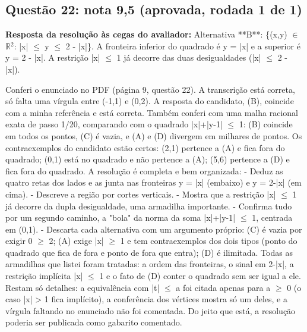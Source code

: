 \documentclass{article}%
\begin{document}
\subsection*{Questão 22: nota 9,5 (aprovada, rodada 1 de 1)}%
\textbf{Resposta da resolução às cegas do avaliador:} Alternativa **B**: \{(x,y) $\in$ $\mathbb{R}$$^2$: |x| $\leq$ y $\leq$ 2 {-} |x|\}. A fronteira inferior do quadrado é y = |x| e a superior é y = 2 {-} |x|. A restrição |x| $\leq$ 1 já decorre das duas desigualdades (|x| $\leq$ 2 {-} |x|).\par %
Conferi o enunciado no PDF (página 9, questão 22). A transcrição está correta, só falta uma vírgula entre (-1,1) e (0,2). A resposta do candidato, (B), coincide com a minha referência e está correta. Também conferi com uma malha racional exata de passo 1/20, comparando com o quadrado |x|+|y-1| $\leq$ 1: (B) coincide em todos os pontos, (C) é vazia, e (A) e (D) divergem em milhares de pontos. Os contraexemplos do candidato estão certos: (2,1) pertence a (A) e fica fora do quadrado; (0,1) está no quadrado e não pertence a (A); (5,6) pertence a (D) e fica fora do quadrado.\newline%
\newline%
A resolução é completa e bem organizada:\newline%
{-} Deduz as quatro retas dos lados e as junta nas fronteiras y = |x| (embaixo) e y = 2-|x| (em cima).\newline%
{-} Descreve a região por cortes verticais.\newline%
{-} Mostra que a restrição |x| $\leq$ 1 já decorre da dupla desigualdade, uma armadilha importante.\newline%
{-} Confirma tudo por um segundo caminho, a "bola" da norma da soma |x|+|y-1| $\leq$ 1, centrada em (0,1).\newline%
{-} Descarta cada alternativa com um argumento próprio: (C) é vazia por exigir 0 $\geq$ 2; (A) exige |x| $\geq$ 1 e tem contraexemplos dos dois tipos (ponto do quadrado que fica de fora e ponto de fora que entra); (D) é ilimitada.\newline%
\newline%
Todas as armadilhas que listei foram tratadas: a ordem das fronteiras, o sinal em 2-|x|, a restrição implícita |x| $\leq$ 1 e o fato de (D) conter o quadrado sem ser igual a ele. Restam só detalhes: a equivalência com |t| $\leq$ a foi citada apenas para a $\geq$ 0 (o caso |x| > 1 fica implícito), a conferência dos vértices mostra só um deles, e a vírgula faltando no enunciado não foi comentada. Do jeito que está, a resolução poderia ser publicada como gabarito comentado.%
$$
\end{document}
